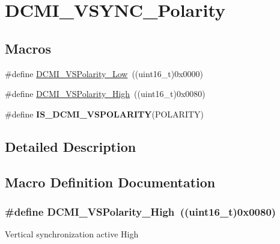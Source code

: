 \hypertarget{group___d_c_m_i___v_s_y_n_c___polarity}{\section{D\-C\-M\-I\-\_\-\-V\-S\-Y\-N\-C\-\_\-\-Polarity}
\label{group___d_c_m_i___v_s_y_n_c___polarity}
}
\subsection*{Macros}
\begin{DoxyCompactItemize}
\item 
\#define \hyperlink{group___d_c_m_i___v_s_y_n_c___polarity_ga7373470d26c50a616f12b2855b29b240}{D\-C\-M\-I\-\_\-\-V\-S\-Polarity\-\_\-\-Low}~((uint16\-\_\-t)0x0000)
\item 
\#define \hyperlink{group___d_c_m_i___v_s_y_n_c___polarity_ga8ee9a81f7d657b0121ddff9ce0ae9bec}{D\-C\-M\-I\-\_\-\-V\-S\-Polarity\-\_\-\-High}~((uint16\-\_\-t)0x0080)
\item 
\#define {\bfseries I\-S\-\_\-\-D\-C\-M\-I\-\_\-\-V\-S\-P\-O\-L\-A\-R\-I\-T\-Y}(P\-O\-L\-A\-R\-I\-T\-Y)
\end{DoxyCompactItemize}


\subsection{Detailed Description}


\subsection{Macro Definition Documentation}
\hypertarget{group___d_c_m_i___v_s_y_n_c___polarity_ga8ee9a81f7d657b0121ddff9ce0ae9bec}{
\subsubsection[{D\-C\-M\-I\-\_\-\-V\-S\-Polarity\-\_\-\-High}]{\setlength{\rightskip}{0pt plus 5cm}\#define D\-C\-M\-I\-\_\-\-V\-S\-Polarity\-\_\-\-High~((uint16\-\_\-t)0x0080)}}\label{group___d_c_m_i___v_s_y_n_c___polarity_ga8ee9a81f7d657b0121ddff9ce0ae9bec}
Vertical synchronization active High 

